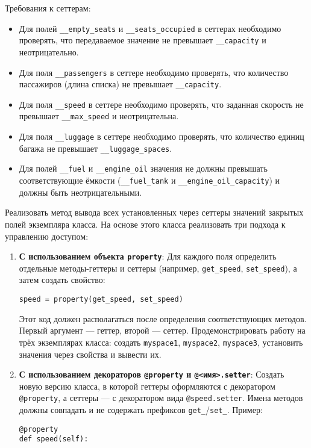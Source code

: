 \begin{enumerate}
Требования к сеттерам:
\begin{itemize}
    \item Для полей \texttt{\_\_empty\_seats} и \texttt{\_\_seats\_occupied} в сеттерах необходимо проверять, что передаваемое значение не превышает \texttt{\_\_capacity} и неотрицательно.  
    \item Для поля \texttt{\_\_passengers} в сеттере необходимо проверять, что количество пассажиров (длина списка) не превышает \texttt{\_\_capacity}.  
    \item Для поля \texttt{\_\_speed} в сеттере необходимо проверять, что заданная скорость не превышает \texttt{\_\_max\_speed} и неотрицательна.  
    \item Для поля \texttt{\_\_luggage} в сеттере необходимо проверять, что количество единиц багажа не превышает \texttt{\_\_luggage\_spaces}.
    \item Для полей \texttt{\_\_fuel} и \texttt{\_\_engine\_oil} значения не должны превышать соответствующие ёмкости (\texttt{\_\_fuel\_tank} и \texttt{\_\_engine\_oil\_capacity}) и должны быть неотрицательными.
\end{itemize}
Реализовать метод вывода всех установленных через сеттеры значений закрытых полей экземпляра класса.
На основе этого класса реализовать три подхода к управлению доступом:
\begin{enumerate}
    \item \textbf{С использованием объекта \texttt{property}}:  
    Для каждого поля определить отдельные методы-геттеры и сеттеры (например, \texttt{get\_speed}, \texttt{set\_speed}), а затем создать свойство:  
    \begin{verbatim}
speed = property(get_speed, set_speed)
    \end{verbatim}  
    Этот код должен располагаться после определения соответствующих методов. Первый аргумент — геттер, второй — сеттер.  
    Продемонстрировать работу на трёх экземплярах класса: создать \texttt{myspace1}, \texttt{myspace2}, \texttt{myspace3}, установить значения через свойства и вывести их.
    \item \textbf{С использованием декораторов \texttt{@property} и \texttt{@<имя>.setter}}:  
    Создать новую версию класса, в которой геттеры оформляются с декоратором \texttt{@property}, а сеттеры — с декоратором вида \texttt{@speed.setter}. Имена методов должны совпадать и не содержать префиксов \texttt{get\_}/\texttt{set\_}.  
    Пример:  
    \begin{verbatim}
@property
def speed(self):

\end{verbatim}
\end{enumerate}
\end{enumerate}
